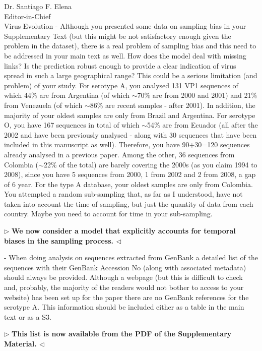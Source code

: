 \documentclass[ucla,biomath,12pt,noaddrfooter,datefrom]{UC_letter}
\newenvironment{reply}{$\triangleright$\bf}{$\triangleleft$}
\begin{document}
\begin{letter}{
Dr. Santiago F. Elena \\
Editor-in-Chief \\
Virus Evolution
}
-       Although you presented some data on sampling bias in your Supplementary Text (but this might be not satisfactory enough given the problem in the dataset), there is a real problem of sampling bias and this need to be addressed in your main text as well. 
How does the model deal with missing links? 
Is the prediction robust enough to provide a clear indication of virus spread in such a large geographical range? 
This could be a serious limitation (and problem) of your study. For serotype A, you analysed 131 VP1 sequences of which 44\% are from Argentina (of which $\sim$70\% are from 2000 and 2001) and 21\% from Venezuela (of which $\sim$86\% are recent samples - after 2001). 
In addition, the majority of your oldest samples are only from Brazil and Argentina. For serotype O, you have 167 sequences in total of which $\sim$54\% are from Ecuador (all after the 2002 and have been previously analysed - along with 30 sequences that have been included in this manuscript as well). 
Therefore, you have 90+30=120 sequences already analysed in a previous paper. 
Among the other, 36 sequences from Colombia ($\sim$22\% of the total) are barely covering the 2000s (as you claim 1994 to 2008), since you have 5 sequences from 2000, 1 from 2002 and 2 from 2008, a gap of 6 year. 
For the type A database, your oldest samples are only from Colombia. You attempted a random sub-sampling that, as far as I understood, have not taken into account the time of sampling, but just the quantity of data from each country. 
Maybe you need to account for time in your sub-sampling.

\begin{reply}
We now consider a model that explicitly accounts for temporal biases in the sampling process. 
\end{reply}

-       When doing analysis on sequences extracted from GenBank a detailed list of the sequences with their GenBank Accession No (along with associated metadata) should always be provided. 
Although a webpage (but this is difficult to check and, probably, the majority of the readers would not bother to access to your website) has been set up for the paper there are no GenBank references for the serotype A. 
This information should be included either as a table in the main text or as a S3.

\begin{reply}
This list is now available from the PDF of the Supplementary Material.
\end{reply}


\end{letter}
\end{document}
